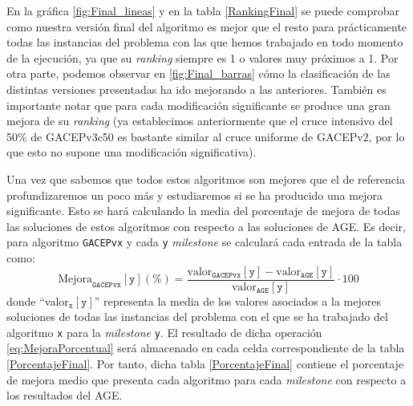 En la gráfica \ref{fig:Final_lineas} y en la tabla \ref{RankingFinal} se puede comprobar como nuestra versión final del algoritmo es mejor que el resto para prácticamente todas las instancias del problema con las que hemos trabajado en todo momento de la ejecución, ya que su \textit{ranking} siempre es 1 o valores muy próximos a 1. 
Por otra parte, podemos observar en \ref{fig:Final_barras} cómo la clasificación de las distintas versiones presentadas ha ido mejorando a las anteriores. 
También es importante notar que para cada modificación significante se produce una gran mejora de su \textit{ranking} (ya establecimos anteriormente que el cruce intensivo del 50\% de GACEPv3c50 es bastante similar al cruce uniforme de GACEPv2, por lo que esto no supone una modificación significativa). 

Una vez que sabemos que todos estos algoritmos son mejores que el de referencia profundizaremos un poco más y estudiaremos si se ha producido una mejora significante. 
Esto se hará calculando la media del porcentaje de mejora de todas las soluciones de estos algoritmos con respecto a las soluciones de AGE. 
Es decir, para algoritmo \texttt{GACEPvx} y cada \texttt{y} \textit{milestone} se calculará cada entrada de la tabla como:
\begin{equation}
\text{Mejora}_{\texttt{GACEPvx}}[\texttt{y}] (\%) = \dfrac{\text{valor}_{\texttt{GACEPvx}}[\texttt{y}] - \text{valor}_{\texttt{AGE}}[\texttt{y}]}{\text{valor}_{\texttt{AGE}}[\texttt{y}]}\cdot 100
\label{eq:MejoraPorcentual}
\end{equation}
donde ``valor$_{\texttt{x}}[\texttt{y}]$'' representa la media de los valores asociados a la mejores soluciones de todas las instancias del problema con el que se ha trabajado del algoritmo \texttt{x} para la \textit{milestone} \texttt{y}. 
El resultado de dicha operación \ref{eq:MejoraPorcentual} será almacenado en cada celda correspondiente de la tabla \ref{PorcentajeFinal}. 
Por tanto, dicha tabla \ref{PorcentajeFinal} contiene el porcentaje de mejora medio que presenta cada algoritmo para cada \textit{milestone} con respecto a los resultados del AGE.

